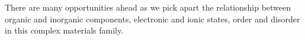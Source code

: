 


There are many opportunities ahead as we pick apart the relationship between organic and inorganic components, electronic and ionic states, order and disorder in this complex materials family. 